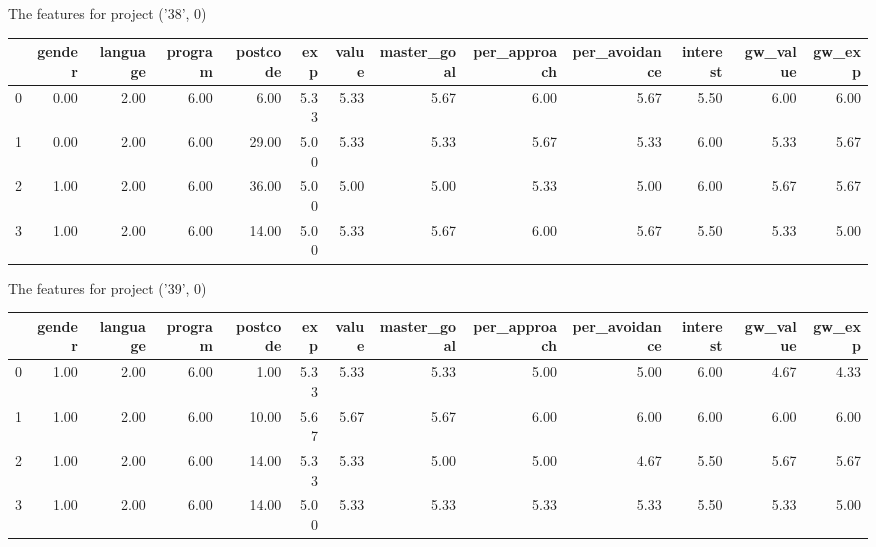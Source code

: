 \documentclass[7pt]{article}
\begin{document}
\begin{landscape}
The features for project ('38', 0)\newline
\begin{tabular}{lrrrrrrrrrrrr}
\toprule
{} &  gender &  language &  program &  postcode &  exp &  value &  master\_goal &  per\_approach &  per\_avoidance &  interest &  gw\_value &  gw\_exp \\
\midrule
0 &    0.00 &      2.00 &     6.00 &      6.00 & 5.33 &   5.33 &         5.67 &          6.00 &           5.67 &      5.50 &             6.00 &           6.00 \\
1 &    0.00 &      2.00 &     6.00 &     29.00 & 5.00 &   5.33 &         5.33 &          5.67 &           5.33 &      6.00 &             5.33 &           5.67 \\
2 &    1.00 &      2.00 &     6.00 &     36.00 & 5.00 &   5.00 &         5.00 &          5.33 &           5.00 &      6.00 &             5.67 &           5.67 \\
3 &    1.00 &      2.00 &     6.00 &     14.00 & 5.00 &   5.33 &         5.67 &          6.00 &           5.67 &      5.50 &             5.33 &           5.00 \\
\bottomrule
\end{tabular}

The features for project ('39', 0)\newline
\begin{tabular}{lrrrrrrrrrrrr}
\toprule
{} &  gender &  language &  program &  postcode &  exp &  value &  master\_goal &  per\_approach &  per\_avoidance &  interest &  gw\_value &  gw\_exp \\
\midrule
0 &    1.00 &      2.00 &     6.00 &      1.00 & 5.33 &   5.33 &         5.33 &          5.00 &           5.00 &      6.00 &             4.67 &           4.33 \\
1 &    1.00 &      2.00 &     6.00 &     10.00 & 5.67 &   5.67 &         5.67 &          6.00 &           6.00 &      6.00 &             6.00 &           6.00 \\
2 &    1.00 &      2.00 &     6.00 &     14.00 & 5.33 &   5.33 &         5.00 &          5.00 &           4.67 &      5.50 &             5.67 &           5.67 \\
3 &    1.00 &      2.00 &     6.00 &     14.00 & 5.00 &   5.33 &         5.33 &          5.33 &           5.33 &      5.50 &             5.33 &           5.00 \\
\bottomrule
\end{tabular}


\end{landscape}
\end{document}
